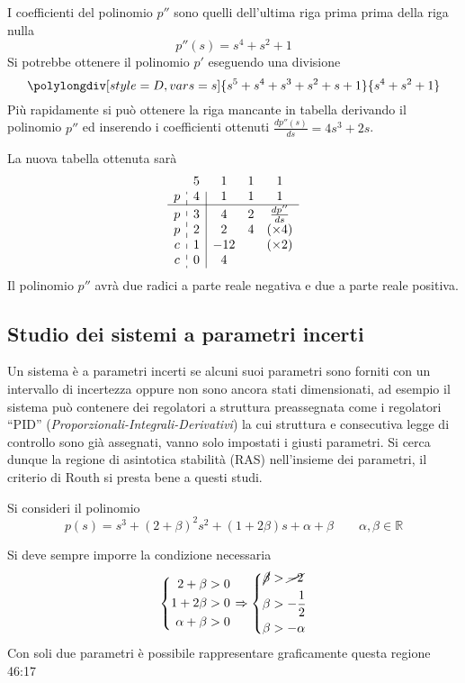 I coefficienti del polinomio $p''$ sono quelli dell'ultima riga prima prima
della riga nulla
$$
p''(s) = s^4 + s^2 + 1
$$
Si potrebbe ottenere il polinomio $p'$ eseguendo una divisione
$$
\polylongdiv[style=D,vars=s]{s^5+s^4+s^3+s^2+s+1}{s^4+s^2+1}
$$
Più rapidamente si può ottenere la riga mancante in tabella derivando il
polinomio $p''$ ed inserendo i coefficienti ottenuti $\frac{dp''(s)}{ds} = 4s^3
+ 2s$.

La nuova tabella ottenuta sarà
$$
\begin{array}{c:c|ccc}
  & 5 & 1 & 1 & 1 \\
p & 4 & 1 & 1 & 1 \\ \hline
p & 3 & 4 & 2 & \frac{dp''}{ds}\\
p & 2 & 2 & 4 &(\times 4)\\
c & 1 & -12 & & (\times2)\\
c & 0 & 4
\end{array}
$$
Il polinomio $p''$ avrà due radici a parte reale negativa e due a parte
reale positiva.

\newpage
\subsection{Studio dei sistemi a parametri incerti}
Un sistema è a parametri incerti se alcuni suoi parametri sono forniti con un
intervallo di incertezza oppure non sono ancora stati dimensionati, ad esempio
il sistema può contenere dei regolatori a struttura preassegnata come i
regolatori ``PID'' (\textit{Proporzionali-Integrali-Derivativi}) la cui
struttura e consecutiva legge di controllo sono già assegnati, vanno solo
impostati i giusti parametri.
Si cerca dunque la regione di asintotica stabilità (RAS) nell'insieme dei
parametri, il criterio di Routh si presta bene a questi studi.

Si consideri il polinomio
$$
p(s) =s^3 + (2+\beta)^2s^2 + (1+2\beta)s + \alpha + \beta \qquad \alpha,\beta
\in \mathbb{R}
$$

Si deve sempre imporre la condizione necessaria
$$\left\{\begin{aligned}
2+\beta &> 0 \\
1+2\beta &> 0 \\
\alpha+ \beta &> 0
\end{aligned}\right.\Rightarrow
\left\{\begin{aligned}
\cancel{\beta} &> \cancel{ -2}\\
\beta & > -\frac{1}{2} \\
\beta & > -\alpha
\end{aligned}\right.
$$
Con soli due parametri è possibile rappresentare graficamente questa regione
46:17
